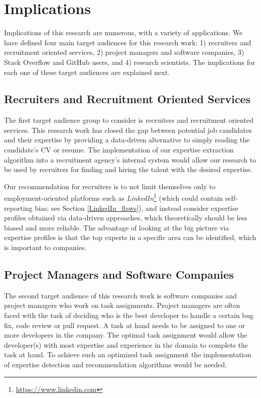     \section{Implications\label{sec:implications}}
    
        Implications of this research are numerous, with a variety of applications. We have defined four main target audiences for this research work: 1) recruiters and recruitment oriented services, 2) project managers and software companies, 3) Stack Overflow and GitHub users, and 4) research scientists. The implications for each one of these target audiences are explained next. 
        
        \subsection{Recruiters and Recruitment Oriented Services}
        
            The first target audience group to consider is recruiters and recruitment oriented services. This research work has closed the gap between potential job candidates and their expertise by providing a data-driven alternative to simply reading the candidate's CV or resume. The implementation of our expertise extraction algorithm into a recruitment agency's internal system would allow our research to be used by recruiters for finding and hiring the talent with the desired expertise. 
            
            Our recommendation for recruiters is to not limit themselves only to employment-oriented platforms such as \emph{LinkedIn}\footnote{\url{https://www.linkedin.com}} (which could contain self-reporting bias; see Section \ref{LinkedIn_flaws}), and instead consider expertise profiles obtained via data-driven approaches, which theoretically should be less biased and more reliable. The advantage of looking at the big picture via expertise profiles is that the top experts in a specific area can be identified, which is important to companies.
            
        \subsection{Project Managers and Software Companies}
        
            The second target audience of this research work is software companies and project managers who work on task assignments. Project managers are often faced with the task of deciding who is the best developer to handle a certain bug fix, code review or pull request. A task at hand needs to be assigned to one or more developers in the company. The optimal task assignment would allow the developer(s) with most expertise and experience in the domain to complete the task at hand. To achieve such an optimized task assignment the implementation of expertise detection and recommendation algorithms would be needed. 
            
